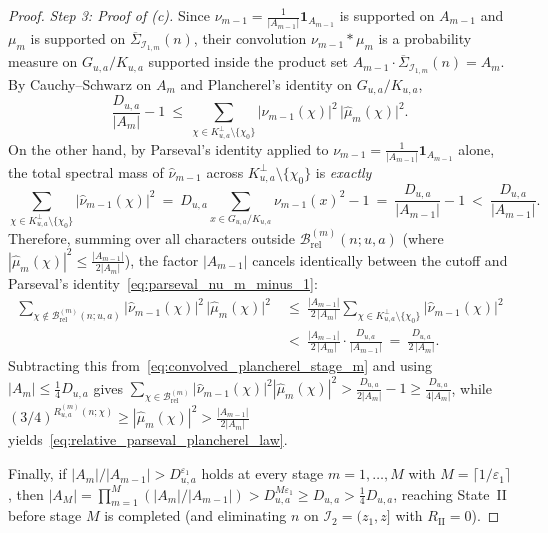\documentclass[11pt, a4paper]{article}
\theoremstyle{plain}
\theoremstyle{definition}
\begin{document}
\begin{proof}
\medskip\noindent\emph{Step 3: Proof of (c).}
Since $\nu_{m-1}=\frac{1}{|A_{m-1}|}\mathbf{1}_{A_{m-1}}$ is supported on $A_{m-1}$ and $\mu_m$ is supported on $\overline{\Sigma}_{\mathcal{I}_{1,m}}(n)$, their convolution $\nu_{m-1}\ast\mu_m$ is a probability measure on $G_{u,a}/K_{u,a}$ supported inside the product set $A_{m-1}\cdot\overline{\Sigma}_{\mathcal{I}_{1,m}}(n)=A_m$. By Cauchy--Schwarz on $A_m$ and Plancherel's identity on $G_{u,a}/K_{u,a}$,
\begin{equation}\label{eq:convolved_plancherel_stage_m}
\frac{D_{u,a}}{|A_m|}-1\ \le\ \sum_{\chi\in K_{u,a}^{\perp}\setminus\{\chi_0\}}\big|\widehat{\nu}_{m-1}(\chi)\big|^{2}\,\big|\widehat{\mu}_m(\chi)\big|^{2}.
\end{equation}
On the other hand, by Parseval's identity applied to $\nu_{m-1}=\allowbreak\frac{1}{|A_{m-1}|}\mathbf{1}_{A_{m-1}}$ alone, the total spectral mass of $\widehat{\nu}_{m-1}$ across $K_{u,a}^{\perp}\setminus\{\chi_0\}$ is \emph{exactly}
\begin{equation}\label{eq:parseval_nu_m_minus_1}
\sum_{\chi\in K_{u,a}^{\perp}\setminus\{\chi_0\}}\big|\widehat{\nu}_{m-1}(\chi)\big|^{2}\ =\ D_{u,a}\sum_{x\in G_{u,a}/K_{u,a}}\nu_{m-1}(x)^{2}-1\ =\ \frac{D_{u,a}}{|A_{m-1}|}-1\ <\ \frac{D_{u,a}}{|A_{m-1}|}.
\end{equation}
Therefore, summing over all characters outside $\mathcal{B}_{\mathrm{rel}}^{(m)}(n;u,a)$ (where $|\widehat{\mu}_m(\chi)|^{2}\le\frac{|A_{m-1}|}{2|A_m|}$), the factor $|A_{m-1}|$ cancels identically between the cutoff and Parseval's identity~\eqref{eq:parseval_nu_m_minus_1}:
\[
\begin{aligned}
\sum_{\chi\notin\mathcal{B}_{\mathrm{rel}}^{(m)}(n;u,a)}\big|\widehat{\nu}_{m-1}(\chi)\big|^{2}\,\big|\widehat{\mu}_m(\chi)\big|^{2}\ &\le\ \frac{|A_{m-1}|}{2\,|A_m|}\sum_{\chi\in K_{u,a}^{\perp}\setminus\{\chi_0\}}\big|\widehat{\nu}_{m-1}(\chi)\big|^{2} \\
&<\ \frac{|A_{m-1}|}{2\,|A_m|}\cdot\frac{D_{u,a}}{|A_{m-1}|}\ =\ \frac{D_{u,a}}{2\,|A_m|}.
\end{aligned}
\]
Subtracting this from~\eqref{eq:convolved_plancherel_stage_m} and using $|A_m|\le\frac14 D_{u,a}$ gives $\sum_{\chi\in\mathcal{B}_{\mathrm{rel}}^{(m)}}|\widehat{\nu}_{m-1}(\chi)|^{2}|\widehat{\mu}_m(\chi)|^{2}>\frac{D_{u,a}}{2|A_m|}-1\ge\frac{D_{u,a}}{4|A_m|}$, while $(3/4)^{R_{u,a}^{(m)}(n;\chi)}\ge|\widehat{\mu}_m(\chi)|^{2}>\frac{|A_{m-1}|}{2|A_m|}$ yields~\eqref{eq:relative_parseval_plancherel_law}. 

Finally, if $|A_m|/|A_{m-1}|>D_{u,a}^{\varepsilon_1}$ holds at every stage $m=1,\dots,M$ with $M=\lceil 1/\varepsilon_1\rceil$, then $|A_M|=\prod_{m=1}^{M}(|A_m|/|A_{m-1}|)>D_{u,a}^{M\varepsilon_1}\ge D_{u,a}>\frac14 D_{u,a}$, reaching State~II before stage $M$ is completed (and eliminating $n$ on $\mathcal{I}_2=(z_1,z]$ with $R_{\mathrm{II}}=0$).
\end{proof}
\end{document}
